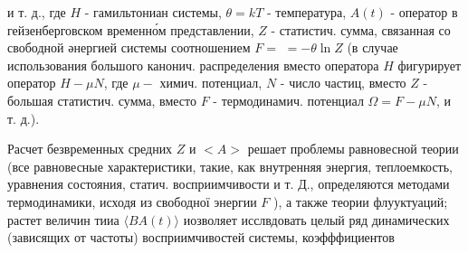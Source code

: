 \documentclass[10pt]{article}
\begin{document}
и т. д., где $H$ - гамильтониан системы, $\theta=k T$ - температура, $A(t)$ - оператор в гейзенберговском временно́м представлении, $Z$ - статистич. сумма, связанная со свободной әнергией системы соотношением $F=$ $=-\theta \ln Z$ (в случае использования большого канонич. распределения вместо оператора $H$ фигурирует оператор $H-\mu N$, где $\mu-$ химич. потенциал, $N$ - число частиц, вместо $Z$ - большая статистич. сумма, вместо $F$ - термодинамич. потенциал $\Omega=F-\mu N$, и т. д.).



Расчет безвременных средних $Z$ и $<A>$ решает проблемы равновесной теории (все равновесные характеристики, такие, как внутренняя энергия, теплоемкость, уравнения состояния, статич. восприимчивости и т. Д., определяются методами термодинамики, исходя из свободної энергии $F$ ), а также теории флууктуаций; растет величин тииа $\langle B A(t)\rangle$ иозволяет исслвдовать целый ряд динамических (зависящих от частоты) восприимчивостей системы, коэфффициентов
\end{document}
